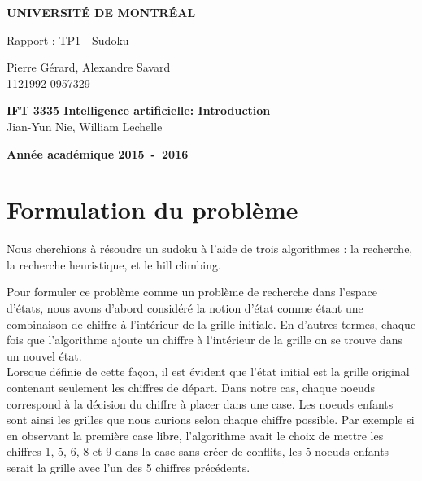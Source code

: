 \documentclass[a4paper,10pt]{article}
\begin{document}
\begin{titlepage}
\begin{center}
\textbf{\textsc{UNIVERSIT\'E DE MONTR\'EAL}}\\
\vfill{}\vfill{}
\begin{center}{\Huge Rapport : TP1 - Sudoku}\end{center}{\Huge \par}
\begin{center}{\large Pierre Gérard, Alexandre Savard \\ 1121992-0957329}\end{center}{\Huge \par}
\vfill{}\vfill{} \vfill{}
\begin{flushleft}{\large \textbf{IFT 3335 Intelligence artificielle: Introduction}}\hfill{\\Jian-Yun Nie, William Lechelle}\end{flushleft}{\large\par}
\vfill{}\vfill{}\enlargethispage{3cm}
\textbf{Année académique 2015~-~2016}
\end{center}
\end{titlepage}



\tableofcontents

\pagebreak


\section{Formulation du problème}
Nous cherchions à résoudre un sudoku à l'aide de trois algorithmes : la recherche, la recherche heuristique, et le hill climbing. 

Pour formuler ce problème comme un problème de recherche dans l'espace d'états, nous avons d'abord considéré la notion d'état comme étant une combinaison de chiffre à l'intérieur de la grille initiale. En d'autres termes, chaque fois que l'algorithme ajoute un chiffre à l'intérieur de la grille on se trouve dans un nouvel état. \\

Lorsque définie de cette façon, il est évident que l'état initial est la grille original contenant seulement les chiffres de départ. Dans notre cas, chaque noeuds correspond à la décision du chiffre à placer dans une case. Les noeuds enfants sont ainsi les grilles que nous aurions selon chaque chiffre possible. Par exemple si en observant la première case libre, l'algorithme avait le choix de mettre les chiffres 1, 5, 6, 8 et 9 dans la case sans créer de conflits, les 5 noeuds enfants serait la grille avec l'un des 5 chiffres précédents. \\
\end{document}
